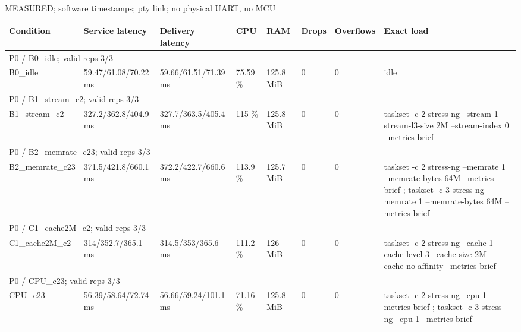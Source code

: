 \par\noindent MEASURED; software timestamps; pty link; no physical UART, no MCU\par
\begin{tabular}{llllllll}
\toprule
Condition & Service latency & Delivery latency & CPU & RAM & Drops & Overflows & Exact load \\
\midrule
\multicolumn{8}{l}{P0 / B0\_idle; valid reps 3/3} \\
B0\_idle & 59.47/61.08/70.22 ms & 59.66/61.51/71.39 ms & 75.59 \% & 125.8 MiB & 0 & 0 & idle \\
\multicolumn{8}{l}{P0 / B1\_stream\_c2; valid reps 3/3} \\
B1\_stream\_c2 & 327.2/362.8/404.9 ms & 327.7/363.5/405.4 ms & 115 \% & 125.8 MiB & 0 & 0 & taskset -c 2 stress-ng --stream 1 --stream-l3-size 2M --stream-index 0 --metrics-brief \\
\multicolumn{8}{l}{P0 / B2\_memrate\_c23; valid reps 3/3} \\
B2\_memrate\_c23 & 371.5/421.8/660.1 ms & 372.2/422.7/660.6 ms & 113.9 \% & 125.7 MiB & 0 & 0 & taskset -c 2 stress-ng --memrate 1 --memrate-bytes 64M --metrics-brief ; taskset -c 3 stress-ng --memrate 1 --memrate-bytes 64M --metrics-brief \\
\multicolumn{8}{l}{P0 / C1\_cache2M\_c2; valid reps 3/3} \\
C1\_cache2M\_c2 & 314/352.7/365.1 ms & 314.5/353/365.6 ms & 111.2 \% & 126 MiB & 0 & 0 & taskset -c 2 stress-ng --cache 1 --cache-level 3 --cache-size 2M --cache-no-affinity --metrics-brief \\
\multicolumn{8}{l}{P0 / CPU\_c23; valid reps 3/3} \\
CPU\_c23 & 56.39/58.64/72.74 ms & 56.66/59.24/101.1 ms & 71.16 \% & 125.8 MiB & 0 & 0 & taskset -c 2 stress-ng --cpu 1 --metrics-brief ; taskset -c 3 stress-ng --cpu 1 --metrics-brief \\
\bottomrule
\end{tabular}

